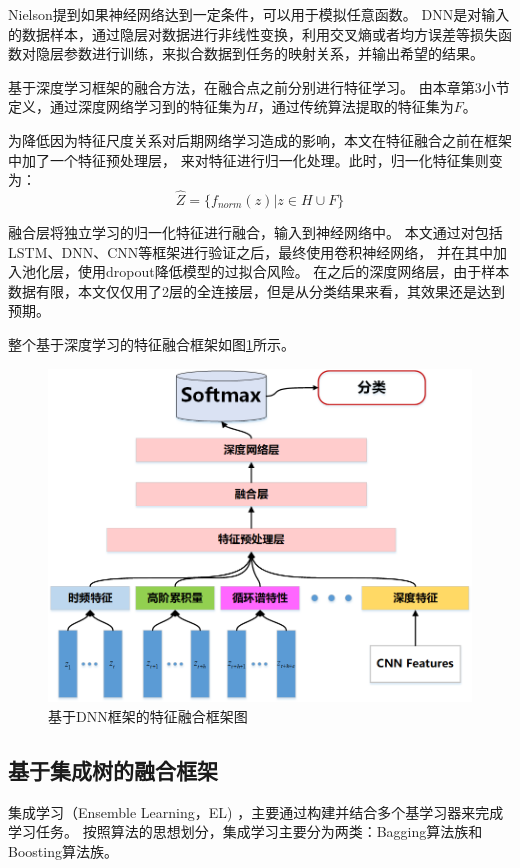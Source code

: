 Nielson提到如果神经网络达到一定条件，可以用于模拟任意函数\cite{nielsen2015neural}。
DNN是对输入的数据样本，通过隐层对数据进行非线性变换，利用交叉熵或者均方误差等损失函数对隐层参数进行训练，来拟合数据到任务的映射关系，并输出希望的结果。\par

基于深度学习框架的融合方法，在融合点之前分别进行特征学习。
由本章第3小节定义，通过深度网络学习到的特征集为$H$，通过传统算法提取的特征集为$F$。\par

为降低因为特征尺度关系对后期网络学习造成的影响，本文在特征融合之前在框架中加了一个特征预处理层，
来对特征进行归一化处理。此时，归一化特征集则变为：
\begin{equation}
	\label{eqt_4_23}
	\hat{Z} =\{ f_{norm}(z) | z \in H \cup F \}
\end{equation}

融合层将独立学习的归一化特征进行融合，输入到神经网络中。
本文通过对包括LSTM、DNN、CNN等框架进行验证之后，最终使用卷积神经网络，
并在其中加入池化层，使用dropout降低模型的过拟合风险。
在之后的深度网络层，由于样本数据有限，本文仅仅用了2层的全连接层，但是从分类结果来看，其效果还是达到预期。\par

整个基于深度学习的特征融合框架如图\ref{sec:fig_4_3}所示。
\begin{figure}[!h]
	\centering
	\includegraphics[scale=0.55]{figures/chapter_4/fig_4_3}
	\caption{基于DNN框架的特征融合框架图}\label{sec:fig_4_3}
\end{figure}


\subsection{基于集成树的融合框架}
集成学习（Ensemble Learning，EL) ，主要通过构建并结合多个基学习器来完成学习任务。
按照算法的思想划分，集成学习主要分为两类：Bagging算法族和Boosting算法族\cite{周志华2016机器学习}。\par

